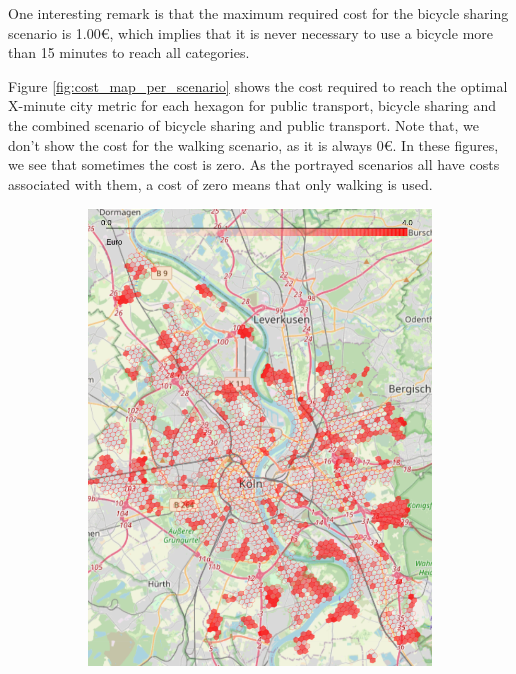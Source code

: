 One interesting remark is that the maximum required cost for the bicycle sharing scenario is 1.00€, which implies that it is never necessary to use a bicycle more than 15 minutes to reach all categories.


Figure \ref{fig:cost_map_per_scenario} shows the cost required to reach the optimal X-minute city metric for each hexagon for public transport, bicycle sharing and the combined scenario of bicycle sharing and public transport.
Note that, we don't show the cost for the walking scenario, as it is always 0€.
In these figures, we see that sometimes the cost is zero.
As the portrayed scenarios all have costs associated with them, a cost of zero means that only walking is used.

\begin{figure}
     \centering
     \begin{subfigure}[b]{0.3\textwidth}
         \centering
         \includegraphics[width=\textwidth]{Figures/results/cost/public_transport_cost_map}

\end{subfigure}
\end{figure}
